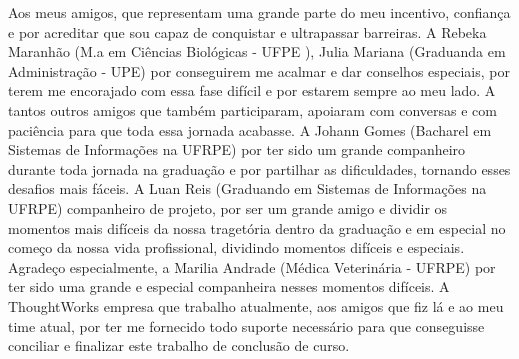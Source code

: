Aos meus amigos, que representam uma grande parte do meu incentivo, confiança e por acreditar que sou capaz de conquistar e ultrapassar barreiras. A Rebeka Maranhão (M.a em Ciências Biológicas - UFPE ), Julia Mariana (Graduanda em Administração - UPE)  por conseguirem me acalmar e dar conselhos especiais, por terem me encorajado com essa fase difícil e por estarem sempre ao meu lado. A tantos outros amigos que também participaram, apoiaram com conversas e com paciência para que toda essa jornada acabasse. A Johann Gomes (Bacharel em Sistemas de Informações na UFRPE) por ter sido um grande companheiro durante toda jornada na graduação e por partilhar as dificuldades, tornando esses desafios mais fáceis. A Luan Reis (Graduando em Sistemas de Informações na UFRPE) companheiro de projeto, por ser um grande amigo e dividir os momentos mais difíceis da nossa tragetória dentro da graduação e em especial no começo da nossa vida profissional, dividindo momentos difíceis e especiais. Agradeço especialmente, a Marilia Andrade (Médica Veterinária - UFRPE) por ter sido uma grande e especial companheira nesses momentos difíceis. A ThoughtWorks empresa que trabalho atualmente, aos amigos que fiz lá e ao meu time atual, por ter me fornecido todo suporte necessário para que conseguisse conciliar e finalizar este trabalho de conclusão de curso. 
